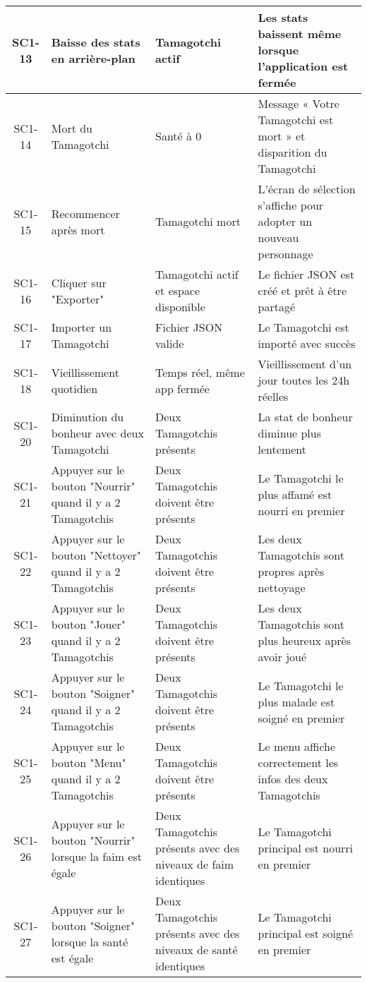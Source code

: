 \documentclass{cahier_de_recette}
\begin{document}
\begin{longtable}{|c|p{4cm}|p{4cm}|p{4cm}|}
\hline
SC1-13 & Baisse des stats en arrière-plan & Tamagotchi actif & Les stats baissent même lorsque l'application est fermée \\
\hline
SC1-14 & Mort du Tamagotchi & Santé à 0 & Message « Votre Tamagotchi est mort » et disparition du Tamagotchi \\
\hline
SC1-15 & Recommencer après mort & Tamagotchi mort & L’écran de sélection s’affiche pour adopter un nouveau personnage \\
\hline
SC1-16 & Cliquer sur "Exporter" & Tamagotchi actif et espace disponible & Le fichier JSON est créé et prêt à être partagé \\
\hline
SC1-17 & Importer un Tamagotchi & Fichier JSON valide & Le Tamagotchi est importé avec succès \\
\hline
SC1-18 & Vieillissement quotidien & Temps réel, même app fermée & Vieillissement d'un jour toutes les 24h réelles \\
\hline
SC1-20 & Diminution du bonheur avec deux Tamagotchi & Deux Tamagotchis présents & La stat de bonheur diminue plus lentement \\
\hline
SC1-21 & Appuyer sur le bouton "Nourrir" quand il y a 2 Tamagotchis & Deux Tamagotchis doivent être présents & Le Tamagotchi le plus affamé est nourri en premier \\
\hline
SC1-22 & Appuyer sur le bouton "Nettoyer" quand il y a 2 Tamagotchis & Deux Tamagotchis doivent être présents & Les deux Tamagotchis sont propres après nettoyage \\
\hline
SC1-23 & Appuyer sur le bouton "Jouer" quand il y a 2 Tamagotchis & Deux Tamagotchis doivent être présents & Les deux Tamagotchis sont plus heureux après avoir joué \\
\hline
SC1-24 & Appuyer sur le bouton "Soigner" quand il y a 2 Tamagotchis & Deux Tamagotchis doivent être présents & Le Tamagotchi le plus malade est soigné en premier \\
\hline
SC1-25 & Appuyer sur le bouton "Menu" quand il y a 2 Tamagotchis & Deux Tamagotchis doivent être présents & Le menu affiche correctement les infos des deux Tamagotchis \\
\hline
SC1-26 & Appuyer sur le bouton "Nourrir" lorsque la faim est égale & Deux Tamagotchis présents avec des niveaux de faim identiques & Le Tamagotchi principal est nourri en premier \\
\hline
SC1-27 & Appuyer sur le bouton "Soigner" lorsque la santé est égale & Deux Tamagotchis présents avec des niveaux de santé identiques & Le Tamagotchi principal est soigné en premier \\
\hline
\end{longtable}
\newpage
\end{document}
